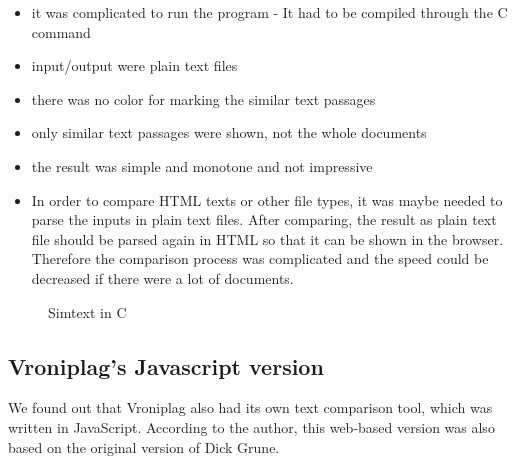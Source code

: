 \begin{itemize}
\item it was complicated to run the program  - It had to be compiled through the C command 
\item input/output were plain text files
\item there was no color for marking the similar text passages
\item only similar text passages were shown, not the whole documents
\item the result was simple and monotone and not impressive
\item In order to compare HTML texts or other file types, it  was maybe needed to parse the inputs in plain text files. After comparing, the result as plain text file should be parsed again in HTML so that it can be shown in the browser. Therefore the comparison process was complicated and the speed could be decreased if there were a lot of documents.
\end{itemize}

\begin{figure}[!h]
  \centering
  \caption{Simtext in C}
  \label{fig:Sim_in_C}
\end{figure}

\subsection{Vroniplag’s Javascript version}
We found out that Vroniplag also had its own text comparison tool, which was written in JavaScript. According to the author, this web-based version was also based on the original version of Dick Grune. %

